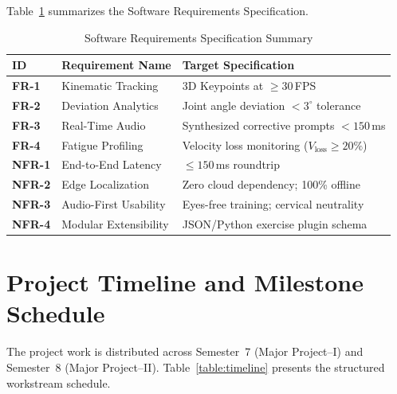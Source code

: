 \documentclass[12pt,a4paper]{report}
\begin{document}
Table~\ref{table:srs_summary} summarizes the Software Requirements Specification.

\begin{table}[ht]
    \caption{Software Requirements Specification Summary}
    \label{table:srs_summary}
    \centering
    \small
    \begin{tabularx}{\linewidth}{>{\bfseries}l >{\raggedright\arraybackslash}p{4cm} >{\raggedright\arraybackslash}X}
        \toprule
        \textbf{ID} & \textbf{Requirement Name} & \textbf{Target Specification} \\
        \midrule
        \textbf{FR-1} & Kinematic Tracking & 33 3D Keypoints at $\ge 30$\,FPS \\
        \textbf{FR-2} & Deviation Analytics & Joint angle deviation $< 3^\circ$ tolerance \\
        \textbf{FR-3} & Real-Time Audio & Synthesized corrective prompts $< 150$\,ms \\
        \textbf{FR-4} & Fatigue Profiling & Velocity loss monitoring ($V_{\text{loss}} \ge 20\%$) \\
        \textbf{NFR-1} & End-to-End Latency & $\le 150$\,ms roundtrip \\
        \textbf{NFR-2} & Edge Localization & Zero cloud dependency; 100\% offline \\
        \textbf{NFR-3} & Audio-First Usability & Eyes-free training; cervical neutrality \\
        \textbf{NFR-4} & Modular Extensibility & JSON/Python exercise plugin schema \\
        \bottomrule
    \end{tabularx}
\end{table}

\section{Project Timeline and Milestone Schedule}
The project work is distributed across Semester~7 (Major Project--I) and Semester~8 (Major Project--II). Table~\ref{table:timeline} presents the structured workstream schedule.
\end{document}
